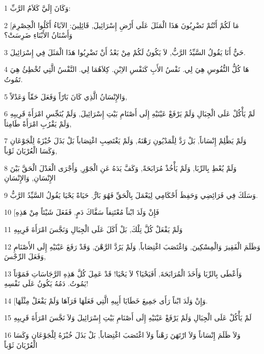 \par 1 وَكَانَ إِلَيَّ كَلاَمُ الرَّبِّ:
\par 2 [مَا لَكُمْ أَنْتُمْ تَضْرِبُونَ هَذَا الْمَثَلَ عَلَى أَرْضِ إِسْرَائِيلَ, قَائِلِينَ: الآبَاءُ أَكَلُوا الْحِصْرِمَ وَأَسْنَانُ الأَبْنَاءِ ضَرِسَتْ؟
\par 3 حَيٌّ أَنَا يَقُولُ السَّيِّدُ الرَّبُّ, لاَ يَكُونُ لَكُمْ مِنْ بَعْدُ أَنْ تَضْرِبُوا هَذَا الْمَثَلَ فِي إِسْرَائِيلَ.
\par 4 هَا كُلُّ النُّفُوسِ هِيَ لِي. نَفْسُ الأَبِ كَنَفْسِ الاِبْنِ. كِلاَهُمَا لِي. النَّفْسُ الَّتِي تُخْطِئُ هِيَ تَمُوتُ.
\par 5 وَالإِنْسَانُ الَّذِي كَانَ بَارّاً وَفَعَلَ حَقّاً وَعَدْلاً,
\par 6 لَمْ يَأْكُلْ عَلَى الْجِبَالِ وَلَمْ يَرْفَعْ عَيْنَيْهِ إِلَى أَصْنَامِ بَيْتِ إِسْرَائِيلَ, وَلَمْ يُنَجِّسِ امْرَأَةَ قَرِيبِهِ وَلَمْ يَقْرُبِ امْرَأَةً طَامِثاً,
\par 7 وَلَمْ يَظْلِمْ إِنْسَاناً, بَلْ رَدَّ لِلْمَدْيُونِ رَهْنَهُ, وَلَمْ يَغْتَصِبِ اغْتِصَاباً بَلْ بَذَلَ خُبْزَهُ لِلْجَوْعَانِ وَكَسَا الْعُرْيَانَ ثَوْباً,
\par 8 وَلَمْ يُعْطِ بِالرِّبَا, وَلَمْ يَأْخُذْ مُرَابَحَةً, وَكَفَّ يَدَهُ عَنِ الْجَوْرِ, وَأَجْرَى الْعَدْلَ الْحَقَّ بَيْنَ الإِنْسَانِ, وَالإِنْسَانِ
\par 9 وَسَلَكَ فِي فَرَائِضِي وَحَفِظَ أَحْكَامِي لِيَعْمَلَ بِالْحَقِّ فَهُوَ بَارٌّ. حَيَاةً يَحْيَا يَقُولُ السَّيِّدُ الرَّبُّ.
\par 10 [فَإِنْ وَلَدَ ابْناً مُعْتَنِفاً سَفَّاكَ دَمٍ, فَفَعَلَ شَيْئاً مِنْ هَذِهِ
\par 11 وَلَمْ يَفْعَلْ كُلَّ تِلْكَ, بَلْ أَكَلَ عَلَى الْجِبَالِ وَنَجَّسَ امْرَأَةَ قَرِيبِهِ
\par 12 وَظَلَمَ الْفَقِيرَ وَالْمِسْكِينَ, وَاغْتَصَبَ اغْتِصَاباً, وَلَمْ يَرُدَّ الرَّهْنَ, وَقَدْ رَفَعَ عَيْنَيْهِ إِلَى الأَصْنَامِ وَفَعَلَ الرِّجْسَ,
\par 13 وَأَعْطَى بِالرِّبَا وَأَخَذَ الْمُرَابَحَةَ, أَفَيَحْيَا؟ لاَ يَحْيَا! قَدْ عَمِلَ كُلَّ هَذِهِ الرَّجَاسَاتِ فَمَوْتاً يَمُوتُ. دَمُهُ يَكُونُ عَلَى نَفْسِهِ!
\par 14 [وَإِنْ وَلَدَ ابْناً رَأَى جَمِيعَ خَطَايَا أَبِيهِ الَّتِي فَعَلَهَا فَرَآهَا وَلَمْ يَفْعَلْ مِثْلَهَا.
\par 15 لَمْ يَأْكُلْ عَلَى الْجِبَالِ وَلَمْ يَرْفَعْ عَيْنَيْهِ إِلَى أَصْنَامِ بَيْتِ إِسْرَائِيلَ وَلاَ نَجَّسَ امْرَأَةَ قَرِيبِهِ
\par 16 وَلاَ ظَلَمَ إِنْسَاناً وَلاَ ارْتَهَنَ رَهْناً وَلاَ اغْتَصَبَ اغْتِصَاباً, بَلْ بَذَلَ خُبْزَهُ لِلْجَوْعَانِ وَكَسَا الْعُرْيَانَ ثَوْباً
